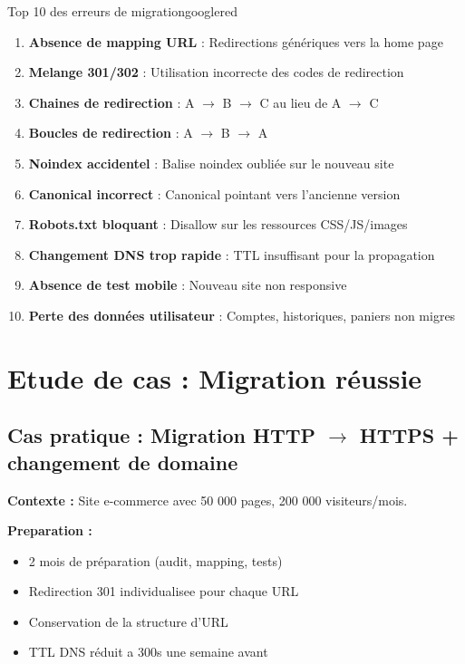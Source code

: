 \documentclass[12pt,a4paper,twoside]{report}
\begin{document}
\begin{mybox}{Top 10 des erreurs de migration}{googlered}
\begin{enumerate}
    \item \textbf{Absence de mapping URL} : Redirections génériques vers la home page
    \item \textbf{Melange 301/302} : Utilisation incorrecte des codes de redirection
    \item \textbf{Chaines de redirection} : A $\rightarrow$ B $\rightarrow$ C au lieu de A $\rightarrow$ C
    \item \textbf{Boucles de redirection} : A $\rightarrow$ B $\rightarrow$ A
    \item \textbf{Noindex accidentel} : Balise noindex oubliée sur le nouveau site
    \item \textbf{Canonical incorrect} : Canonical pointant vers l'ancienne version
    \item \textbf{Robots.txt bloquant} : Disallow sur les ressources CSS/JS/images
    \item \textbf{Changement DNS trop rapide} : TTL insuffisant pour la propagation
    \item \textbf{Absence de test mobile} : Nouveau site non responsive
    \item \textbf{Perte des données utilisateur} : Comptes, historiques, paniers non migres
\end{enumerate}
\end{mybox}

\section{Etude de cas : Migration réussie}

\subsection{Cas pratique : Migration HTTP $\rightarrow$ HTTPS + changement de domaine}

\textbf{Contexte :} Site e-commerce avec 50 000 pages, 200 000 visiteurs/mois.

\textbf{Preparation :}
\begin{itemize}
    \item 2 mois de préparation (audit, mapping, tests)
    \item Redirection 301 individualisee pour chaque URL
    \item Conservation de la structure d'URL
    \item TTL DNS réduit a 300s une semaine avant
\end{itemize}
\end{document}
